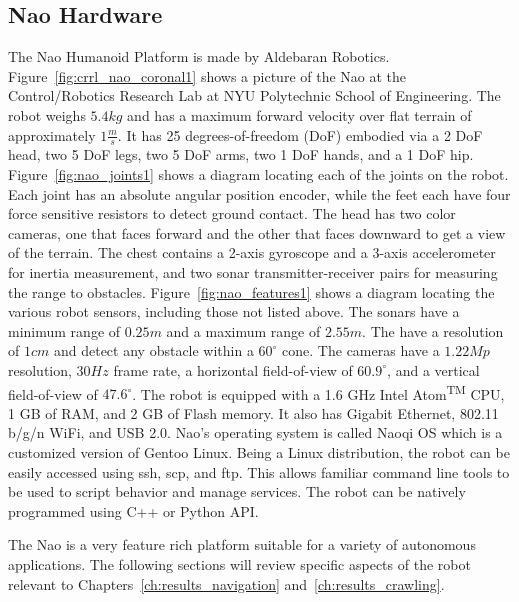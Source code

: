 \subsection{Nao Hardware}
The Nao Humanoid Platform is made by Aldebaran Robotics. 
Figure~\ref{fig:crrl_nao_coronal1} shows a picture of the Nao at the
Control/Robotics Research Lab at NYU Polytechnic School of Engineering.
The robot weighs $5.4 kg$ and has a maximum forward velocity over flat
terrain of approximately $1 \frac{m}{s}$.
It has 25 degrees-of-freedom (DoF) embodied via a 2 DoF head, two 5 DoF legs,
two 5 DoF arms, two 1 DoF hands, and a 1 DoF hip.
Figure~\ref{fig:nao_joints1} shows a diagram locating each of the joints on
the robot.
Each joint has an absolute angular position encoder, while the feet each have
four force sensitive resistors to detect ground contact.
The head has two color cameras, one that faces forward and the other that faces
downward to get a view of the terrain. The chest contains a 2-axis gyroscope and
a 3-axis accelerometer for inertia measurement, and two sonar transmitter-receiver
pairs for measuring the range to obstacles.
Figure~\ref{fig:nao_features1} shows a diagram locating the various robot sensors,
including those not listed above.
The sonars have a minimum range of $0.25 m$ and a maximum range of $2.55 m$.
The have a resolution of $1 cm$ and detect any obstacle within a $60^\circ$
cone. The cameras have a $1.22 Mp$ resolution, $30 Hz$ frame rate,
a horizontal field-of-view of $60.9^\circ$, and a vertical field-of-view of
$47.6^\circ$.
The robot is equipped with a 1.6 GHz Intel\textsuperscript{\textregistered}
Atom\textsuperscript{TM} CPU, 1 GB of RAM, and 2 GB of Flash memory.
It also has Gigabit Ethernet, 802.11 b/g/n WiFi, and USB 2.0. 
Nao's operating system is called Naoqi OS which is a customized version of
Gentoo Linux. Being a Linux distribution, the robot can be easily accessed
using ssh, scp, and ftp. This allows familiar command line tools to be used
to script behavior and manage services.
The robot can be natively programmed using C++ or Python API.

The Nao is a very feature rich platform suitable for a variety of autonomous
applications. The following sections will review specific aspects of the robot
relevant to Chapters~\ref{ch:results_navigation} and~\ref{ch:results_crawling}.


